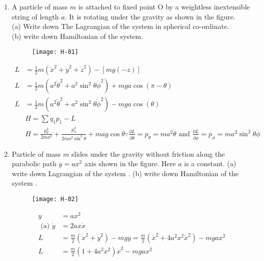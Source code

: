 \begin{enumerate}
\item A particle of mass $m$ is attached to fixed point $\mathrm{O}$ by a weightless inextensible string of length $a$. It is rotating under the gravity as shown in the figure.\\
(a) Write down The Lagrangian of the system in spherical co-ordinate.\\
(b) write down Hamiltonian of the system.
\begin{figure}[H]
	\centering
	\texttt{[image: H-01]}
\end{figure}
\begin{answer}
	\begin{align*}
	L&=\frac{1}{2} m\left(\dot{x}^{2}+\dot{y}^{2}+\dot{z}^{2}\right)-[m g(-z)]\\
	L&=\frac{1}{2} m\left(a^{2} \dot{\theta}^{2}+a^{2} \sin ^{2} \theta \dot{\phi}^{2}\right)+m g a \cos (\pi-\theta)\\
	L&=\frac{1}{2} m\left(a^{2} \dot{\theta}^{2}+a^{2} \sin ^{2} \theta \dot{\phi}^{2}\right)-m g a \cos (\theta)\\
	&H=\sum \dot{q}_{1} p_{1}-L \\
	&H=\frac{p_{\theta}^{2}}{2 m a^{2}}+\frac{p_{\phi}^{2}}{2 m a^{2} \sin ^{2} \theta}+m a g \cos \theta \because \frac{\partial L}{\partial \dot{\theta}}=p_{\theta}=m a^{2} \dot{\theta} \text { and } \frac{\partial L}{\partial \dot{\phi}}=p_{\phi}=m a^{2} \sin ^{2} \theta \dot{\phi}
	\end{align*}
\end{answer}
\item Particle of mass $m$ slides under the gravity without friction along the parabolic path $y=a x^{2}$ axis shown in the figure. Here $a$ is a constant.
(a) write down Lagrangian of the system .
(b) write down Hamiltonian of the system .
\begin{figure}[H]
	\centering
	\texttt{[image: H-02]}
\end{figure}
\begin{answer}
	\begin{align*}
	y&=a x^{2}\\
	\text { (a) } \dot{y}&=2 a x \dot{x}\\
	L&=\frac{m}{2}\left(\dot{x}^{2}+\dot{y}^{2}\right)-m g y=\frac{m}{2}\left(\dot{x}^{2}+4 a^{2} x^{2} \dot{x}^{2}\right)-m g a x^{2}\\
	L&=\frac{m}{2}\left(1+4 a^{2} x^{2}\right) \dot{x}^{2}-m g a x^{2}\\

\end{align*}
\end{answer}
\end{enumerate}
